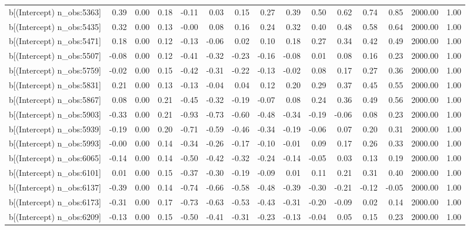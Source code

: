 \begin{table}[ht]
\begin{tabular}{rrrrrrrrrrrrrrr}
  b[(Intercept) n\_obs:5363] & 0.39 & 0.00 & 0.18 & -0.11 & 0.03 & 0.15 & 0.27 & 0.39 & 0.50 & 0.62 & 0.74 & 0.85 & 2000.00 & 1.00 \\ 
  b[(Intercept) n\_obs:5435] & 0.32 & 0.00 & 0.13 & -0.00 & 0.08 & 0.16 & 0.24 & 0.32 & 0.40 & 0.48 & 0.58 & 0.64 & 2000.00 & 1.00 \\ 
  b[(Intercept) n\_obs:5471] & 0.18 & 0.00 & 0.12 & -0.13 & -0.06 & 0.02 & 0.10 & 0.18 & 0.27 & 0.34 & 0.42 & 0.49 & 2000.00 & 1.00 \\ 
  b[(Intercept) n\_obs:5507] & -0.08 & 0.00 & 0.12 & -0.41 & -0.32 & -0.23 & -0.16 & -0.08 & 0.01 & 0.08 & 0.16 & 0.23 & 2000.00 & 1.00 \\ 
  b[(Intercept) n\_obs:5759] & -0.02 & 0.00 & 0.15 & -0.42 & -0.31 & -0.22 & -0.13 & -0.02 & 0.08 & 0.17 & 0.27 & 0.36 & 2000.00 & 1.00 \\ 
  b[(Intercept) n\_obs:5831] & 0.21 & 0.00 & 0.13 & -0.13 & -0.04 & 0.04 & 0.12 & 0.20 & 0.29 & 0.37 & 0.45 & 0.55 & 2000.00 & 1.00 \\ 
  b[(Intercept) n\_obs:5867] & 0.08 & 0.00 & 0.21 & -0.45 & -0.32 & -0.19 & -0.07 & 0.08 & 0.24 & 0.36 & 0.49 & 0.56 & 2000.00 & 1.00 \\ 
  b[(Intercept) n\_obs:5903] & -0.33 & 0.00 & 0.21 & -0.93 & -0.73 & -0.60 & -0.48 & -0.34 & -0.19 & -0.06 & 0.08 & 0.23 & 2000.00 & 1.00 \\ 
  b[(Intercept) n\_obs:5939] & -0.19 & 0.00 & 0.20 & -0.71 & -0.59 & -0.46 & -0.34 & -0.19 & -0.06 & 0.07 & 0.20 & 0.31 & 2000.00 & 1.00 \\ 
  b[(Intercept) n\_obs:5993] & -0.00 & 0.00 & 0.14 & -0.34 & -0.26 & -0.17 & -0.10 & -0.01 & 0.09 & 0.17 & 0.26 & 0.33 & 2000.00 & 1.00 \\ 
  b[(Intercept) n\_obs:6065] & -0.14 & 0.00 & 0.14 & -0.50 & -0.42 & -0.32 & -0.24 & -0.14 & -0.05 & 0.03 & 0.13 & 0.19 & 2000.00 & 1.00 \\ 
  b[(Intercept) n\_obs:6101] & 0.01 & 0.00 & 0.15 & -0.37 & -0.30 & -0.19 & -0.09 & 0.01 & 0.11 & 0.21 & 0.31 & 0.40 & 2000.00 & 1.00 \\ 
  b[(Intercept) n\_obs:6137] & -0.39 & 0.00 & 0.14 & -0.74 & -0.66 & -0.58 & -0.48 & -0.39 & -0.30 & -0.21 & -0.12 & -0.05 & 2000.00 & 1.00 \\ 
  b[(Intercept) n\_obs:6173] & -0.31 & 0.00 & 0.17 & -0.73 & -0.63 & -0.53 & -0.43 & -0.31 & -0.20 & -0.09 & 0.02 & 0.14 & 2000.00 & 1.00 \\ 
  b[(Intercept) n\_obs:6209] & -0.13 & 0.00 & 0.15 & -0.50 & -0.41 & -0.31 & -0.23 & -0.13 & -0.04 & 0.05 & 0.15 & 0.23 & 2000.00 & 1.00 \\ 

\end{tabular}
\end{table}
